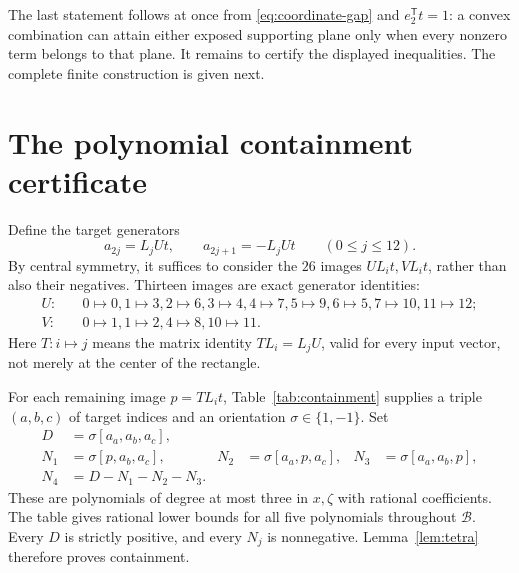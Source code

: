 \documentclass[11pt,a4paper]{article}
\theoremstyle{definition}\newtheorem{definition}[theorem]{Definition}
\theoremstyle{remark}\newtheorem{remark}[theorem]{Remark}
\newcommand{\tr}{\mathsf T}
\newcommand{\cB}{\mathcal B}
\begin{document}
The last statement follows at once from \eqref{eq:coordinate-gap} and
$e_2^\tr t=1$: a convex combination can attain either exposed supporting
plane only when every nonzero term belongs to that plane.
It remains to certify the displayed inequalities. The complete finite
construction is given next.

\section{The polynomial containment certificate}
\label{sec:containment}

Define the target generators
\begin{equation}
 a_{2j}=L_jUt,\qquad a_{2j+1}=-L_jUt\qquad(0\le j\le12).
 \label{eq:signed-targets}
\end{equation}
By central symmetry, it suffices to consider the $26$ images
$UL_it,VL_it$, rather than also their negatives.
Thirteen images are exact generator identities:
\begin{align}
 U:&\quad
 0\mapsto0,
 1\mapsto3,
 2\mapsto6,
 3\mapsto4,
 4\mapsto7,
 5\mapsto9,
 6\mapsto5,
 7\mapsto10,
 11\mapsto12;
 \label{eq:U-identities}\\
 V:&\quad 0\mapsto1,
 1\mapsto2,
 4\mapsto8,
 10\mapsto11.
 \label{eq:V-identities}
\end{align}
Here $T:i\mapsto j$ means the matrix identity $TL_i=L_jU$, valid for every
input vector, not merely at the center of the rectangle.

For each remaining image $p=TL_it$, Table~\ref{tab:containment} supplies a
triple $(a,b,c)$ of target indices and an orientation $\sigma\in\{1,-1\}$.
Set
\begin{align*}
 D&=\sigma[a_a,a_b,a_c],\\
 N_1&=\sigma[p,a_b,a_c],&
 N_2&=\sigma[a_a,p,a_c],&
 N_3&=\sigma[a_a,a_b,p],\\
 N_4&=D-N_1-N_2-N_3.
\end{align*}
These are polynomials of degree at most three in $x,\zeta$ with rational
coefficients. The table gives rational lower bounds for all five
polynomials throughout $\cB$. Every $D$ is strictly positive, and every
$N_j$ is nonnegative. Lemma~\ref{lem:tetra} therefore proves containment.
\end{document}
